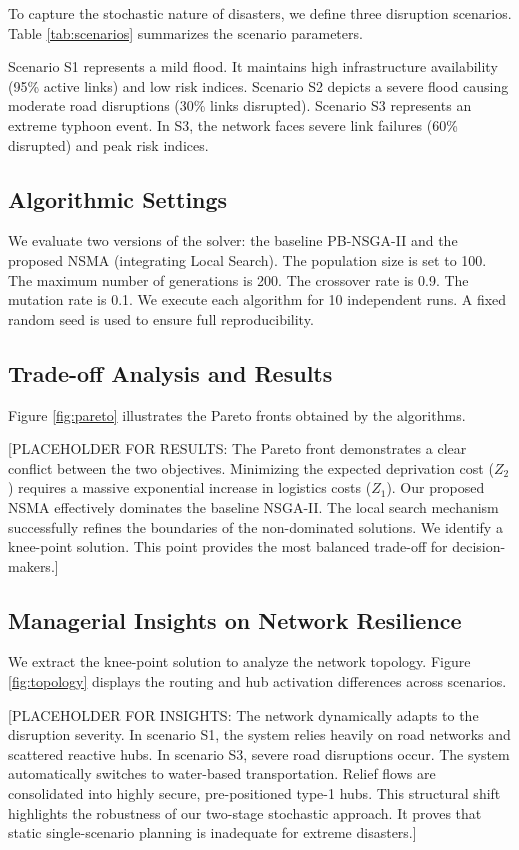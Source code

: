 \documentclass{llncs}
\begin{document}
{To capture the stochastic nature of disasters, we define three disruption scenarios. Table \ref{tab:scenarios} summarizes the scenario parameters.

Scenario S1 represents a mild flood. It maintains high infrastructure availability (95\% active links) and low risk indices. Scenario S2 depicts a severe flood causing moderate road disruptions (30\% links disrupted). Scenario S3 represents an extreme typhoon event. In S3, the network faces severe link failures (60\% disrupted) and peak risk indices.

\subsection{Algorithmic Settings}
We evaluate two versions of the solver: the baseline PB-NSGA-II and the proposed NSMA (integrating Local Search). The population size is set to 100. The maximum number of generations is 200. The crossover rate is 0.9. The mutation rate is 0.1. We execute each algorithm for 10 independent runs. A fixed random seed is used to ensure full reproducibility.

\subsection{Trade-off Analysis and Results}
Figure \ref{fig:pareto} illustrates the Pareto fronts obtained by the algorithms. 

[PLACEHOLDER FOR RESULTS: The Pareto front demonstrates a clear conflict between the two objectives. Minimizing the expected deprivation cost ($Z_2$) requires a massive exponential increase in logistics costs ($Z_1$). Our proposed NSMA effectively dominates the baseline NSGA-II. The local search mechanism successfully refines the boundaries of the non-dominated solutions. We identify a knee-point solution. This point provides the most balanced trade-off for decision-makers.]


\subsection{Managerial Insights on Network Resilience}
We extract the knee-point solution to analyze the network topology. Figure \ref{fig:topology} displays the routing and hub activation differences across scenarios.

[PLACEHOLDER FOR INSIGHTS: The network dynamically adapts to the disruption severity. In scenario S1, the system relies heavily on road networks and scattered reactive hubs. In scenario S3, severe road disruptions occur. The system automatically switches to water-based transportation. Relief flows are consolidated into highly secure, pre-positioned type-1 hubs. This structural shift highlights the robustness of our two-stage stochastic approach. It proves that static single-scenario planning is inadequate for extreme disasters.]

}
\end{document}
